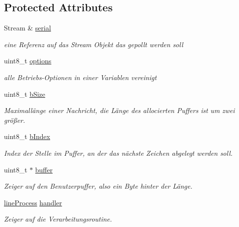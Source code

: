 \subsection*{Protected Attributes}
\begin{DoxyCompactItemize}
\item 
Stream \& \hyperlink{class_s_serial_af44a40fe24625e4e17194246271e0598}{serial}
\begin{DoxyCompactList}\small\item\em eine Referenz auf das Stream Objekt das gepollt werden soll \end{DoxyCompactList}\item 
uint8\+\_\+t \hyperlink{class_s_serial_a3255a7976e6239590a0c092db3786e12}{options}
\begin{DoxyCompactList}\small\item\em alle Betriebs-\/\+Optionen in einer Variablen vereinigt \end{DoxyCompactList}\item 
uint8\+\_\+t \hyperlink{class_s_serial_aaff6d77ae9a9b281c2f5ad22188fffab}{b\+Size}
\begin{DoxyCompactList}\small\item\em Maximallänge einer Nachricht, die Länge des allocierten Puffers ist um zwei größer. \end{DoxyCompactList}\item 
uint8\+\_\+t \hyperlink{class_s_serial_a17036a378a918f18f0fc05b7d7adf7bd}{b\+Index}
\begin{DoxyCompactList}\small\item\em Index der Stelle im Puffer, an der das nächste Zeichen abgelegt werden soll. \end{DoxyCompactList}\item 
uint8\+\_\+t $\ast$ \hyperlink{class_s_serial_a56fe3cf5655bae95a5bc80230280dde3}{buffer}
\begin{DoxyCompactList}\small\item\em Zeiger auf den Benutzerpuffer, also ein Byte hinter der Länge. \end{DoxyCompactList}\item 
\hyperlink{_whandall_serial_8h_a3241d91f371dd5951b01532bce8e7be2}{line\+Process} \hyperlink{class_s_serial_a544190e3b803cb35b4ec5e5fa9bb3ff0}{handler}
\begin{DoxyCompactList}\small\item\em Zeiger auf die Verarbeitungsroutine. \end{DoxyCompactList}\end{DoxyCompactItemize}



